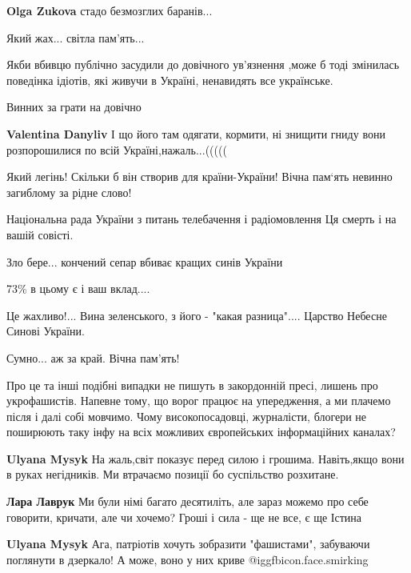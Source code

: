 \begin{itemize}
\begin{itemize}
\textbf{Olga Zukova} стадо безмозглих баранів...
\end{itemize} %

Який жах... світла пам'ять...


Якби вбивцю публічно засудили до довічного ув'язнення ,може б тоді змінилась
поведінка ідіотів, які живучи в Україні, ненавидять все українське.

Винних за грати на довічно

\begin{itemize} %
\textbf{Valentina Danyliv} І що його там одягати, кормити, ні знищити гниду вони розпорошилися по всій Україні,нажаль...(((((
\end{itemize} %

Який легінь! Скільки б він створив для країни-України! Вічна пам‘ять невинно загиблому за рідне слово!

Національна рада України з питань телебачення і радіомовлення
Ця смерть і на вашій совісті.

Зло бере... кончений сепар вбиває кращих синів України

73\% в цьому є і ваш вклад....

Це жахливо!... Вина зеленського, з його - "какая разница".... Царство Небесне Синові України.

Сумно... аж за край. Вічна пам'ять!


Про це та інші подібні випадки не пишуть в закордонній пресі, лишень про
укрофашистів. Напевне тому, що ворог працює на упередження, а ми плачемо після
і далі собі мовчимо. Чому високопосадовці, журналісти, блогери не поширюють
таку інфу на всіх можливих європейських інформаційних каналах?

\begin{itemize} %
\textbf{Ulyana Mysyk} На жаль,світ показує перед силою і грошима. Навіть,якщо вони в руках негідників. Ми втрачаємо позиції бо суспільство розхитане.

\textbf{Лара Лаврук} Ми були німі багато десятиліть, але зараз можемо про себе говорити, кричати, але чи хочемо? Гроші і сила - ще не все, є ще Істина

\textbf{Ulyana Mysyk}
Ага, патріотів хочуть зобразити "фашистами", забуваючи поглянути в дзеркало!
А може, воно у них криве @igg{fbicon.face.smirking} 


\end{itemize}
\end{itemize}

